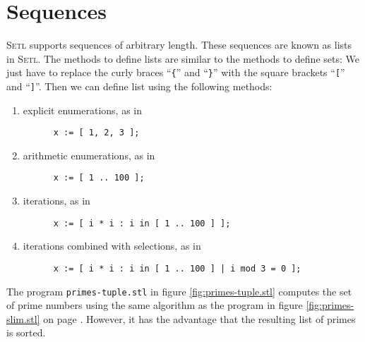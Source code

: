 \section{Sequences}
\textsc{Setl} supports sequences of arbitrary length. These sequences are known as lists
in \textsc{Setl}.  The methods to define lists  are  similar to the methods
to define sets:  We just have to replace the curly braces 
 ``\texttt{\{}'' and ``\texttt{\}}'' with the square brackets  ``\texttt{[}'' and  ``\texttt{]}''.
Then we can define list using the following methods:
\begin{enumerate}
\item explicit enumerations, as in 
      \vspace*{-0.3cm}
      \begin{verbatim}
      x := [ 1, 2, 3 ];
      \end{verbatim}
      \vspace*{-0.7cm}
\item arithmetic enumerations, as in 
      \vspace*{-0.3cm}
      \begin{verbatim}
      x := [ 1 .. 100 ];
      \end{verbatim}
      \vspace*{-0.7cm}
\item iterations, as in 
      \vspace*{-0.3cm}
      \begin{verbatim}
      x := [ i * i : i in [ 1 .. 100 ] ];
      \end{verbatim}
      \vspace*{-0.7cm}
\item iterations combined with selections, as in
      \vspace*{-0.3cm}
      \begin{verbatim}
      x := [ i * i : i in [ 1 .. 100 ] | i mod 3 = 0 ];
      \end{verbatim}
      \vspace*{-0.7cm}
\end{enumerate}
The program \texttt{primes-tuple.stl} in figure \ref{fig:primes-tuple.stl} computes the
set of prime numbers using the same algorithm as the  program in figure \ref{fig:primes-slim.stl} on page
\pageref{fig:primes-slim.stl}.  However, it has the advantage that the resulting 
list of primes  is sorted.

